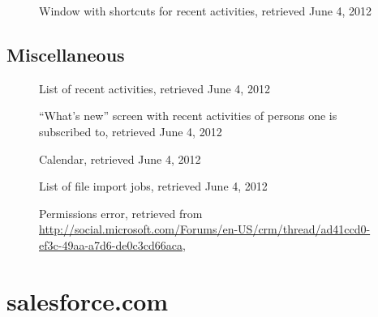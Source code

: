 \begin{figure}[htbp]
	\centering
	\caption[Microsoft Dynamics CRM: Window with shortcuts for recent activities]{Window with shortcuts for recent activities, retrieved June 4, 2012}
\end{figure}

\FloatBarrier
\subsection{Miscellaneous}
\begin{figure}[htbp]
	\centering
	\caption[Microsoft Dynamics CRM: List of recent activities]{List of recent activities, retrieved June 4, 2012}
\end{figure}

\begin{figure}[htbp]
	\centering
	\caption[Microsoft Dynamics CRM: ``What's new'' screen with recent activities of persons one is subscribed to]{``What's new'' screen with recent activities of persons one is subscribed to, retrieved June 4, 2012}
\end{figure}

\begin{figure}[htbp]
	\centering
	\caption[Microsoft Dynamics CRM: Calendar]{Calendar, retrieved June 4, 2012}
\end{figure}

\begin{figure}[htbp]
	\centering
	\caption[Microsoft Dynamics CRM: List of file import jobs]{List of file import jobs, retrieved June 4, 2012}
\end{figure}

\begin{figure}[htbp]
	\centering
	\caption[Microsoft Dynamics CRM: Permissions error]{Permissions error, retrieved from \url{http://social.microsoft.com/Forums/en-US/crm/thread/ad41ccd0-ef3c-49aa-a7d6-de0c3cd66aca}, \downloadDate}
\end{figure}

\FloatBarrier %
\section{salesforce.com}
\label{appsec:salesforce}

